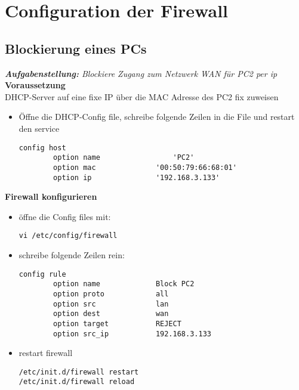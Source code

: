 \section{Configuration der Firewall}
\subsection{Blockierung eines PCs}
\textit{\textbf{Aufgabenstellung:} Blockiere Zugang zum Netzwerk WAN für PC2 per ip}\\
\textbf{Voraussetzung}\\
DHCP-Server auf eine fixe IP über die MAC Adresse des PC2 fix zuweisen
\begin{itemize}
\item Öffne die DHCP-Config file, schreibe folgende Zeilen in die File und restart den service
\begin{verbatim}
config host
        option name 				'PC2'
        option mac 				'00:50:79:66:68:01'
        option ip 				'192.168.3.133'
\end{verbatim}
\end{itemize}
\textbf{Firewall konfigurieren}
\begin{itemize}
\item öffne die Config files mit:
\begin{verbatim}
vi /etc/config/firewall
\end{verbatim}
\item schreibe folgende Zeilen rein:
\begin{verbatim}
config rule                                         
        option name             Block PC2           
        option proto            all                 
        option src              lan                 
        option dest             wan                 
        option target           REJECT              
        option src_ip           192.168.3.133  
\end{verbatim}
\item restart firewall
\begin{verbatim}
/etc/init.d/firewall restart
/etc/init.d/firewall reload
\end{verbatim}
\end{itemize}

\newpage

